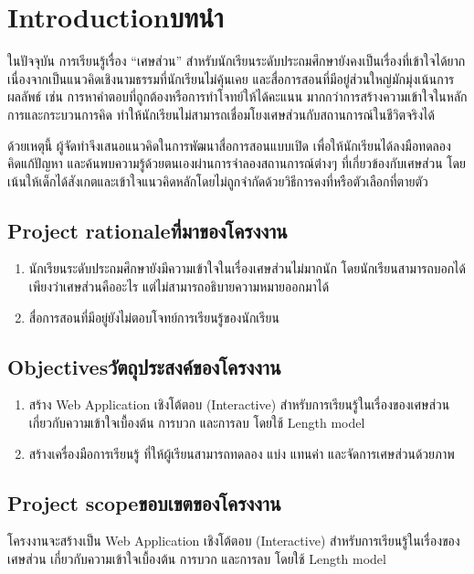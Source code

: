 \chapter{\ifenglish Introduction\else บทนำ\fi}
ในปัจจุบัน การเรียนรู้เรื่อง “เศษส่วน” สำหรับนักเรียนระดับประถมศึกษายังคงเป็นเรื่องที่เข้าใจได้ยาก เนื่องจากเป็นแนวคิดเชิงนามธรรมที่นักเรียนไม่คุ้นเคย และสื่อการสอนที่มีอยู่ส่วนใหญ่มักมุ่งเน้นการผลลัพธ์ เช่น การหาคำตอบที่ถูกต้องหรือการทำโจทย์ให้ได้คะแนน มากกว่าการสร้างความเข้าใจในหลักการและกระบวนการคิด ทำให้นักเรียนไม่สามารถเชื่อมโยงเศษส่วนกับสถานการณ์ในชีวิตจริงได้

ด้วยเหตุนี้ ผู้จัดทำจึงเสนอแนวคิดในการพัฒนาสื่อการสอนแบบเปิด เพื่อให้นักเรียนได้ลงมือทดลอง คิดแก้ปัญหา และค้นพบความรู้ด้วยตนเองผ่านการจำลองสถานการณ์ต่างๆ ที่เกี่ยวข้องกับเศษส่วน โดยเน้นให้เด็กได้สังเกตและเข้าใจแนวคิดหลักโดยไม่ถูกจำกัดด้วยวิธีการคงที่หรือตัวเลือกที่ตายตัว

\section{\ifenglish Project rationale\else ที่มาของโครงงาน\fi}
\begin{enumerate}
    \item นักเรียนระดับประถมศึกษายังมีความเข้าใจในเรื่องเศษส่วนไม่มากนัก โดยนักเรียนสามารถบอกได้\\
    เพียงว่าเศษส่วนคืออะไร แต่ไม่สามารถอธิบายความหมายออกมาได้
    \item สื่อการสอนที่มีอยู่ยังไม่ตอบโจทย์การเรียนรู้ของนักเรียน
\end{enumerate}

\section{\ifenglish Objectives\else วัตถุประสงค์ของโครงงาน\fi}
\begin{enumerate}
    \item สร้าง Web Application เชิงโต้ตอบ (Interactive) สำหรับการเรียนรู้ในเรื่องของเศษส่วน เกี่ยวกับความเข้าใจเบื้องต้น การบวก และการลบ โดยใช้ Length model
    \item สร้างเครื่องมือการเรียนรู้ ที่ให้ผู้เรียนสามารถทดลอง แบ่ง แทนค่า และจัดการเศษส่วนด้วยภาพ
\end{enumerate}

\section{\ifenglish Project scope\else ขอบเขตของโครงงาน\fi}
โครงงานจะสร้างเป็น Web Application เชิงโต้ตอบ (Interactive) สำหรับการเรียนรู้ในเรื่องของเศษส่วน เกี่ยวกับความเข้าใจเบื้องต้น การบวก และการลบ โดยใช้ Length model

